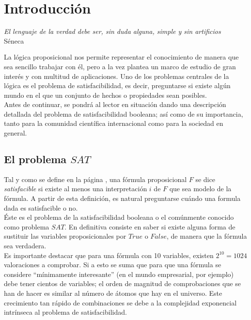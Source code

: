 \chapter*{Introducción}

\begin{center}
\textit{El lenguaje de la verdad debe ser, sin duda alguna, simple y sin artificios}\\
\hspace{10.7cm} Séneca
\end{center}

La lógica proposicional nos permite representar el conocimiento de manera que sea sencillo trabajar con él, pero a la vez plantea un marco de estudio de gran interés y con multitud de aplicaciones. Uno de los problemas centrales de la lógica es el problema de satisfacibilidad, es decir, preguntarse si existe algún mundo en el que un conjunto de hechos o propiedades sean posibles.\\

Antes de continuar, se pondrá al lector en situación dando una descripción detallada del problema de satisfacibilidad booleana; así como de su importancia, tanto para la comunidad científica internacional como para la sociedad en general.

\section{El problema $SAT$}

Tal y como se define en la página \pageref{def:sat}, una fórmula proposicional $F$ se dice \textit{satisfacible} si existe al menos una interpretación $i$ de $F$ que sea modelo de la fórmula. A partir de esta definición, es natural preguntarse cuándo una formula dada es satisfacible o no. \\ 

Éste es el problema de la satisfacibilidad booleana o el comúnmente conocido como problema $SAT$. En definitiva consiste en saber si existe alguna forma de sustituir las variables proposicionales por $True$ o $False$, de manera que la fórmula sea verdadera. \\

Es importante destacar que para una fórmula con 10 variables, existen $2^{10} = 1024$ valoraciones a comprobar. Si a esto se suma que para que una fórmula se considere ``mínimamente interesante'' (en el mundo empresarial, por ejemplo) debe tener cientos de variables; el orden de magnitud de comprobaciones que se han de hacer es similar al número de átomos que hay en el universo. Este crecimiento tan rápido de combinaciones se debe a la complejidad exponencial intrínseca al problema de satisfacibilidad. \\

